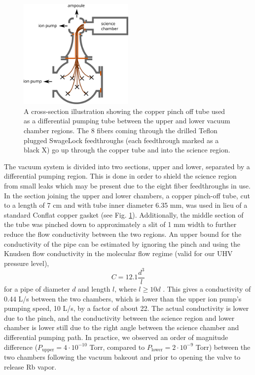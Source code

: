 \begin{figure}
    \centering
    \includegraphics[width=0.5\textwidth]{Images/differential_pumping.pdf}
    \caption{A cross-section illustration showing the copper pinch off tube used as a differential pumping tube between the upper and lower vacuum chamber regions. The 8 fibers coming through the drilled Teflon plugged SwageLock feedthroughs (each feedthrough marked as a black X) go up through the copper tube and into the science region.}
    \label{fig:differential_pumping}
\end{figure}

The vacuum system is divided into two sections, upper and lower, separated by a differential pumping region. This is done in order to shield the science region from small leaks which may be present due to the eight fiber feedthroughs in use. In the section joining the upper and lower chambers, a copper pinch-off tube, cut to a length of 7 cm and with tube inner diameter 6.35 mm, was used in lieu of a standard Conflat copper gasket (see Fig. \ref{fig:differential_pumping}). Additionally, the middle section of the tube was pinched down to approximately a slit of 1 mm width to further reduce the flow conductivity between the two regions. An upper bound for the conductivity of the pipe can be estimated by ignoring the pinch and using the Knudsen flow conductivity in the molecular flow regime (valid for our UHV pressure level),
\begin{equation}
     C = 12.1\frac{d^3}{l}
\end{equation}
for a pipe of diameter $d$ and length $l$, where $l \geq 10d$ \cite{Marquardt1999}. This gives a conductivity of 0.44 L/s between the two chambers, which is lower than the upper ion pump's pumping speed, 10 L/s, by a factor of about 22. The actual conductivity is lower due to the pinch, and the conductivity between the science region and lower chamber is lower still due to the right angle between the science chamber and differential pumping path. In practice, we observed an order of magnitude difference ($P_{\textrm{upper}}=4\cdot10^{-10}$ Torr, compared to $P_{\textrm{lower}}=2\cdot10^{-9}$ Torr) between the two chambers following the vacuum bakeout and prior to opening the valve to release Rb vapor.


